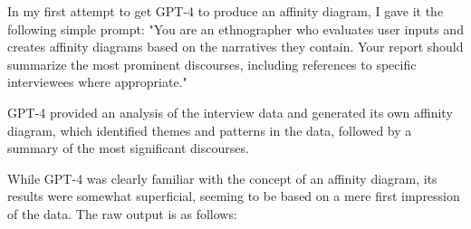 \documentclass[
]{book}
\begin{document}
In my first attempt to get GPT-4 to produce an affinity diagram, I gave it the following simple prompt: "You are an ethnographer who evaluates user inputs and creates affinity diagrams based on the narratives they contain. Your report should summarize the most prominent discourses, including references to specific interviewees where appropriate."

GPT-4 provided an analysis of the interview data and generated its own affinity diagram, which identified themes and patterns in the data, followed by a summary of the most significant discourses.

While GPT-4 was clearly familiar with the concept of an affinity diagram, its results were somewhat superficial, seeming to be based on a mere first impression of the data. The raw output is as follows:
\end{document}
